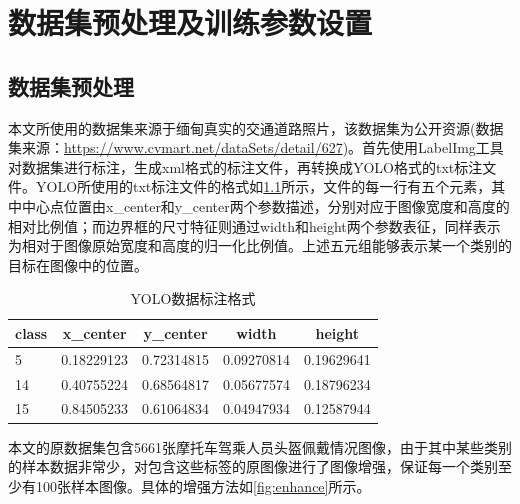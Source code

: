\chapter{数据集预处理及训练参数设置}

\section{数据集预处理}
本文所使用的数据集来源于缅甸真实的交通道路照片，该数据集为公开资源(数据集来源：\url{https://www.cvmart.net/dataSets/detail/627})。首先使用LabelImg工具对数据集进行标注，生成xml格式的标注文件，再转换成YOLO格式的txt标注文件。YOLO所使用的txt标注文件的格式如\ref{tab:format}所示，文件的每一行有五个元素，其中中心点位置由x\_center和y\_center两个参数描述，分别对应于图像宽度和高度的相对比例值；而边界框的尺寸特征则通过width和height两个参数表征，同样表示为相对于图像原始宽度和高度的归一化比例值。上述五元组能够表示某一个类别的目标在图像中的位置。

\begin{table}[htb]
      \centering
      \caption[目标数据]{YOLO数据标注格式\label{tab:format}}
      \begin{tabular}{lrrrr}
          \toprule
          \multicolumn{1}{c}{class} & \multicolumn{1}{c}{x\_center} & \multicolumn{1}{c}{y\_center} & \multicolumn{1}{c}{width} & \multicolumn{1}{c}{height} \\
          \midrule
          5 & 0.18229123 & 0.72314815 & 0.09270814 & 0.19629641 \\
          14 & 0.40755224 & 0.68564817 & 0.05677574 & 0.18796234 \\
          15 & 0.84505233 & 0.61064834 & 0.04947934 & 0.12587944 \\
          \bottomrule
      \end{tabular}
\end{table}


本文的原数据集包含5661张摩托车驾乘人员头盔佩戴情况图像，由于其中某些类别的样本数据非常少，对包含这些标签的原图像进行了图像增强，保证每一个类别至少有100张样本图像。具体的增强方法如\ref{fig:enhance}所示。

